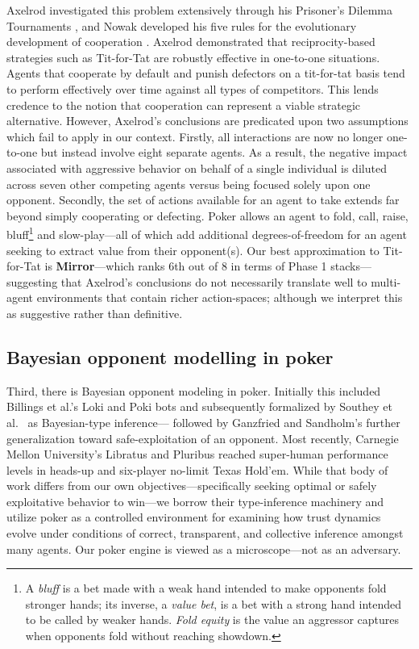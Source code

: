\documentclass[10pt]{article} %
\newcommand{\arch}[1]{\textbf{#1}}
\begin{document}
Axelrod investigated this problem extensively through his Prisoner's
Dilemma Tournaments \citep{axelrod1984evolution}, and Nowak
developed his five rules for the evolutionary development of
cooperation \citep{nowak2006five}. Axelrod demonstrated that
reciprocity-based strategies such as Tit-for-Tat are robustly
effective in one-to-one situations. Agents that cooperate by default
and punish defectors on a tit-for-tat basis tend to perform
effectively over time against all types of competitors. This lends
credence to the notion that cooperation can represent a viable
strategic alternative. However, Axelrod's conclusions are predicated
upon two assumptions which fail to apply in our context. Firstly,
all interactions are now no longer one-to-one but instead involve
eight separate agents. As a result, the negative impact associated
with aggressive behavior on behalf of a single individual is diluted
across seven other competing agents versus being focused solely upon
one opponent. Secondly, the set of actions available for an agent to
take extends far beyond simply cooperating or defecting. Poker
allows an agent to fold, call, raise,
bluff\footnote{A \textit{bluff} is a bet made with a weak hand
intended to make opponents fold stronger hands; its inverse, a
\textit{value bet}, is a bet with a strong hand intended to be
called by weaker hands. \textit{Fold equity} is the value an
aggressor captures when opponents fold without reaching showdown.}
and slow-play---all of which add additional degrees-of-freedom for
an agent seeking to extract value from their opponent(s). Our best
approximation to Tit-for-Tat is \arch{Mirror}---which ranks 6th out
of 8 in terms of Phase 1 stacks---suggesting that Axelrod's conclusions do
not necessarily translate well to multi-agent environments that
contain richer action-spaces; although we interpret this as
suggestive rather than definitive.

\subsection{Bayesian opponent modelling in poker}
Third, there is Bayesian opponent modeling in poker. Initially
this included Billings et al.'s Loki and Poki bots
\citep{billings1998opponent} and subsequently formalized by Southey
et al.\ \citep{southey2005bayes} as Bayesian-type inference---
followed by Ganzfried and Sandholm's \citep{ganzfried2015safe}
further generalization toward safe-exploitation of an opponent. Most
recently, Carnegie Mellon University's Libratus and Pluribus
\citep{brown2018superhuman,brown2019superhuman} reached super-human
performance levels in heads-up and six-player no-limit Texas
Hold'em. While that body of work differs from our own
objectives---specifically seeking optimal or safely exploitative
behavior to win---we borrow their type-inference machinery and
utilize poker as a controlled environment for examining how trust
dynamics evolve under conditions of correct, transparent, and
collective inference amongst many agents. Our poker engine is viewed
as a microscope---not as an adversary.
\end{document}

